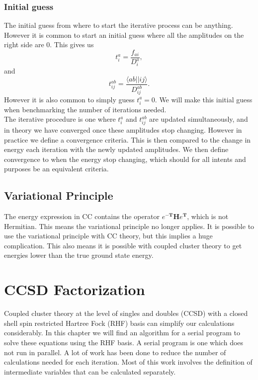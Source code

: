 \documentclass[a4paper,norsk,11pt,twoside]{report}
\begin{document}
\subsection{Initial guess}
The initial guess from where to start the iterative process can be anything. However it is common to start an initial guess where all the amplitudes on the right side are 0. This gives us
\begin{equation}
t_i^a = \frac{f_{ai}}{D_i^a},
\end{equation}
and
\begin{equation}
t_{ij}^{ab} = \frac{\langle ab || ij \rangle}{D_{ij}^{ab}} .
\end{equation}
However it is also common to simply guess $t_i^a = 0$. We will make this initial guess when benchmarking the number of iterations needed.\\

The iterative procedure is one where $t_i^a$ and $t_{ij}^{ab}$ are
updated simultaneously, and in theory we have converged once these
amplitudes stop changing. However in practice we define a convergence
criteria. This is then compared to the change in energy each iteration
with the newly updated amplitudes. We then define convergence to when
the energy stop changing, which should for all intents and purposes be
an equivalent criteria.

\section{Variational Principle}
The energy expression in CC contains the operator $e^{-\textbf{T}}
\textbf{H} e^{\textbf{T}}$, which is not Hermitian. This means the
variational principle no longer applies. It is possible to use the
variational principle with CC theory, but this implies a huge complication. This
also means it is possible with coupled cluster theory to get energies lower
than the true ground state energy.

\chapter{CCSD Factorization}
Coupled cluster theory at the level of singles and doubles (CCSD) with
a closed shell spin restricted Hartree Fock (RHF) basis can simplify
our calculations considerably. In this chapter we will find an
algorithm for a serial program to solve these equations using the RHF
basis. A serial program is one which does not run in parallel. A lot
of work has been done to reduce the number of calculations needed for
each iteration. Most of this work involves the definition of
intermediate variables that can be calculated separately. \\
\end{document}
